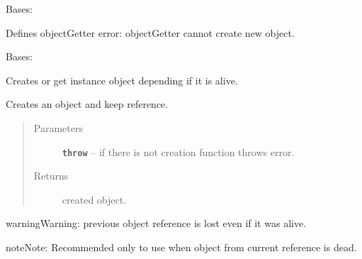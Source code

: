 \documentclass[letterpaper,10pt,english]{sphinxmanual}
\begin{document}

\begin{fulllineitems}
\label{RRtoolbox.lib:RRtoolbox.lib.cache.notCreatable}
Bases: 

Defines objectGetter error: objectGetter cannot create new object.

\end{fulllineitems}


\begin{fulllineitems}
\label{RRtoolbox.lib:RRtoolbox.lib.cache.objectGetter}
Bases: 

Creates or get instance object depending if it is alive.

\begin{fulllineitems}
\label{RRtoolbox.lib:RRtoolbox.lib.cache.objectGetter.create}
Creates an object and keep reference.
\begin{quote}\begin{description}
\item[{Parameters}] \leavevmode
\textbf{\texttt{throw}} -- if there is not creation function throws error.

\item[{Returns}] \leavevmode
created object.

\end{description}\end{quote}

\begin{notice}{warning}{Warning:}
previous object reference is lost even if it was alive.
\end{notice}

\begin{notice}{note}{Note:}
Recommended only to use when object from current reference is dead.
\end{notice}

\end{fulllineitems}



\end{fulllineitems}
\end{document}

